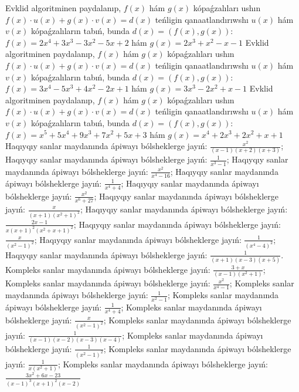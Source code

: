 Evklid algoritminen paydalanıp, $f(x)$ hám $g(x)$ kópaǵzalıları ushın $f(x) \cdot u(x)+g(x) \cdot v(x)=d(x)$ teńligin qanaatlandırıwshı $u(x)$ hám $v(x)$ kópaǵzalıların tabıń, bunda $d(x)=(f(x), g(x))$:  $f(x)=2 x^4+3 x^3-3 x^2-5 x+2$ hám $g(x)=2 x^3+x^2-x-1$
Evklid algoritminen paydalanıp, $f(x)$ hám $g(x)$ kópaǵzalıları ushın $f(x) \cdot u(x)+g(x) \cdot v(x)=d(x)$ teńligin qanaatlandırıwshı $u(x)$ hám $v(x)$ kópaǵzalıların tabıń, bunda $d(x)=(f(x), g(x))$:  $f(x)=3 x^4-5 x^3+4 x^2-2 x+1$ hám $g(x)=3 x^3-2 x^2+x-1$
Evklid algoritminen paydalanıp, $f(x)$ hám $g(x)$ kópaǵzalıları ushın $f(x) \cdot u(x)+g(x) \cdot v(x)=d(x)$ teńligin qanaatlandırıwshı $u(x)$ hám $v(x)$ kópaǵzalıların tabıń, bunda $d(x)=(f(x), g(x))$:  $f(x)=x^5+5 x^4+9 x^3+7 x^2+5 x+3$ hám $g(x)=x^4+2 x^3+2 x^2+x+1$
Haqıyqıy sanlar maydanında ápiwayı bólsheklerge jayıń:  $\frac{x^2}{(x-1)(x+2)(x+3)}$;
Haqıyqıy sanlar maydanında ápiwayı bólsheklerge jayıń:  $\frac{1}{x^3-1}$;
Haqıyqıy sanlar maydanında ápiwayı bólsheklerge jayıń:  $\frac{x^2}{x^4-16}$;
Haqıyqıy sanlar maydanında ápiwayı bólsheklerge jayıń:  $\frac{1}{x^4+4}$;
Haqıyqıy sanlar maydanında ápiwayı bólsheklerge jayıń:  $\frac{x^2}{x^6+27}$;
Haqıyqıy sanlar maydanında ápiwayı bólsheklerge jayıń:  $\frac{x}{(x+1)\left(x^2+1\right)^2}$;
Haqıyqıy sanlar maydanında ápiwayı bólsheklerge jayıń:  $\frac{2 x-1}{x(x+1)^2\left(x^2+x+1\right)^2}$;
Haqıyqıy sanlar maydanında ápiwayı bólsheklerge jayıń:  $\frac{x}{\left(x^2-1\right)^2}$;
Haqıyqıy sanlar maydanında ápiwayı bólsheklerge jayıń:  $\frac{1}{\left(x^4-4\right)^2}$;
Haqıyqıy sanlar maydanında ápiwayı bólsheklerge jayıń:  $\frac{1}{(x+1)(x-3)(x+5)}$.
Kompleks sanlar maydanında ápiwayı bólsheklerge jayıń: $\frac{3+x}{(x-1)\left(x^2+1\right)}$;
Kompleks sanlar maydanında ápiwayı bólsheklerge jayıń: $\frac{x^2}{x^4-1}$;
Kompleks sanlar maydanında ápiwayı bólsheklerge jayıń: $\frac{1}{x^2-1}$;
Kompleks sanlar maydanında ápiwayı bólsheklerge jayıń: $\frac{1}{x^4+4}$;
Kompleks sanlar maydanında ápiwayı bólsheklerge jayıń: $\frac{x}{\left(x^2-1\right)^2}$;
Kompleks sanlar maydanında ápiwayı bólsheklerge jayıń: $\frac{1}{(x-1)(x-2)(x-3)(x-4)}$;
Kompleks sanlar maydanında ápiwayı bólsheklerge jayıń: $\frac{1}{\left(x^2-1\right)^2}$;
Kompleks sanlar maydanında ápiwayı bólsheklerge jayıń: $\frac{1}{x\left(x^2+1\right)}$;
Kompleks sanlar maydanında ápiwayı bólsheklerge jayıń: $\frac{3 x^2+6 x-23}{(x-1)^3(x+1)^2(x-2)}$